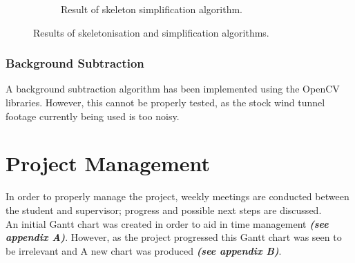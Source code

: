 \documentclass[a4paper, 12pt]{article}
\begin{document}
\begin{figure}[H]
\begin{subfigure}{\textwidth}
  		\caption{Result of skeleton simplification algorithm.}
  		\label{fig:skel_reduced}
	\end{subfigure}
\caption{Results of skeletonisation and simplification algorithms.}
\end{figure}
%
\subsubsection{Background Subtraction}
	A background subtraction algorithm has been implemented using the OpenCV libraries\cite{OpenCV}. However, this cannot be properly tested, as the stock wind tunnel footage currently being used is too noisy.
\section{Project Management}
In order to properly manage the project, weekly meetings are conducted between the student and supervisor; progress and possible next steps are discussed.\\
An initial Gantt chart was created in order to aid in time management \textbf{\emph{(see appendix A)}}. However, as the project progressed this Gantt chart was seen to be irrelevant and A new chart was produced \textbf{\emph{(see appendix B)}}.
\end{document}

